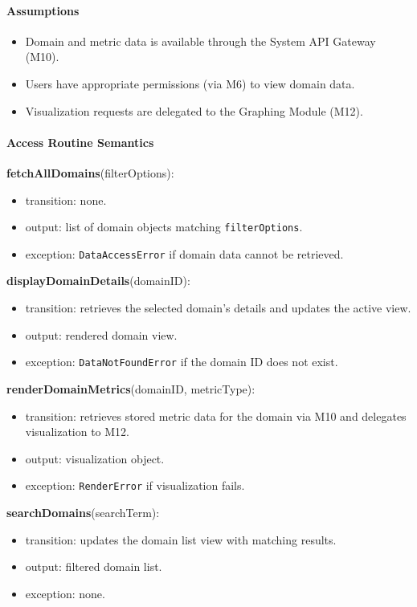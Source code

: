 \documentclass[12pt, titlepage]{article}
\begin{document}
\paragraph{Assumptions}
\begin{itemize}
  \item Domain and metric data is available through the System API Gateway (M10).
  \item Users have appropriate permissions (via M6) to view domain data.
  \item Visualization requests are delegated to the Graphing Module (M12).
\end{itemize}

\paragraph{Access Routine Semantics}

\noindent \textbf{fetchAllDomains}(filterOptions):
\begin{itemize}
  \item transition: none.
  \item output: list of domain objects matching \texttt{filterOptions}.
  \item exception: \texttt{DataAccessError} if domain data cannot be retrieved.
\end{itemize}

\noindent \textbf{displayDomainDetails}(domainID):
\begin{itemize}
  \item transition: retrieves the selected domain’s details and updates the active view.
  \item output: rendered domain view.
  \item exception: \texttt{DataNotFoundError} if the domain ID does not exist.
\end{itemize}

\noindent \textbf{renderDomainMetrics}(domainID, metricType):
\begin{itemize}
  \item transition: retrieves stored metric data for the domain via M10 and delegates visualization to M12.
  \item output: visualization object.
  \item exception: \texttt{RenderError} if visualization fails.
\end{itemize}

\noindent \textbf{searchDomains}(searchTerm):
\begin{itemize}
  \item transition: updates the domain list view with matching results.
  \item output: filtered domain list.
  \item exception: none.
\end{itemize}
\end{document}

